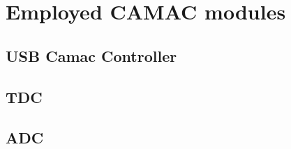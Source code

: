 
\chapter{Employed CAMAC modules}
\label{app:A}

\section{USB Camac Controller}
\label{sec:A.1}

\section{TDC}
\label{sec:A.2}

\section{ADC}
\label{sec:A.2}
